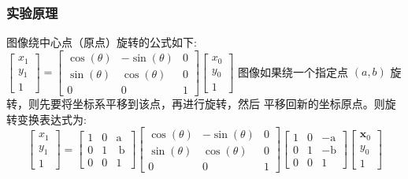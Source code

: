 \documentclass{ctexart}
\begin{document}
\subsubsection{\hei 实验原理}
图像绕中心点（原点）旋转的公式如下:
$\left[\begin{array}{l}x_{1} \\ y_{1} \\ 1\end{array}\right]=\left[\begin{array}{lll}\cos (\theta) & -\sin (\theta) & 0 \\ \sin (\theta) & \cos (\theta) & 0 \\ 0 & 0 & 1\end{array}\right]\left[\begin{array}{l}x_{0} \\ y_{0} \\ 1\end{array}\right]$
图像如果绕一个指定点 $(a, b)$ 旋转，则先要将坐标系平移到该点，再进行旋转，然后 平移回新的坐标原点。则旋转变换表达式为:
$$\left[\begin{array}{l}x_{1} \\ y_{1} \\ 1\end{array}\right]=\left[\begin{array}{ccc}1 & 0 & \mathrm{a} \\ 0 & 1 & \mathrm{~b} \\ 0 & 0 & 1\end{array}\right]\left[\begin{array}{lcc}\cos (\theta) & -\sin (\theta) & 0 \\ \sin (\theta) & \cos (\theta) & 0 \\ 0 & 0 & 1\end{array}\right]\left[\begin{array}{ccc}1 & 0 & -\mathrm{a} \\ 0 & 1 & -\mathrm{b} \\ 0 & 0 & 1\end{array}\right]\left[\begin{array}{l}\boldsymbol{x}_{0} \\ y_{0} \\ 1\end{array}\right]$$
\end{document}
